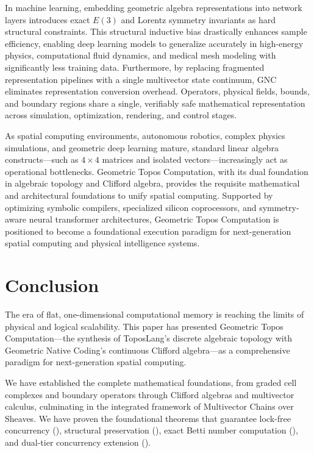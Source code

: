 \documentclass[manuscript, nonacm, review=false]{acmart}
\theoremstyle{definition}
\theoremstyle{plain}
\begin{document}
In machine learning, embedding geometric algebra representations into network layers introduces exact $E(3)$ and Lorentz symmetry invariants as hard structural constraints. This structural inductive bias drastically enhances sample efficiency, enabling deep learning models to generalize accurately in high-energy physics, computational fluid dynamics, and medical mesh modeling with significantly less training data. Furthermore, by replacing fragmented representation pipelines with a single multivector state continuum, GNC eliminates representation conversion overhead. Operators, physical fields, bounds, and boundary regions share a single, verifiably safe mathematical representation across simulation, optimization, rendering, and control stages.

As spatial computing environments, autonomous robotics, complex physics simulations, and geometric deep learning mature, standard linear algebra constructs---such as $4 \times 4$ matrices and isolated vectors---increasingly act as operational bottlenecks. Geometric Topos Computation, with its dual foundation in algebraic topology and Clifford algebra, provides the requisite mathematical and architectural foundations to unify spatial computing. Supported by optimizing symbolic compilers, specialized silicon coprocessors, and symmetry-aware neural transformer architectures, Geometric Topos Computation is positioned to become a foundational execution paradigm for next-generation spatial computing and physical intelligence systems.



\section{Conclusion}
\label{sec:conclusion}

The era of flat, one-dimensional computational memory is reaching the limits of physical and logical scalability. This paper has presented Geometric Topos Computation---the synthesis of ToposLang's discrete algebraic topology with Geometric Native Coding's continuous Clifford algebra---as a comprehensive paradigm for next-generation spatial computing.

We have established the complete mathematical foundations, from graded cell complexes and boundary operators through Clifford algebras and multivector calculus, culminating in the integrated framework of Multivector Chains over Sheaves. We have proven the foundational theorems that guarantee lock-free concurrency (), structural preservation (), exact Betti number computation (), and dual-tier concurrency extension ().
\end{document}
